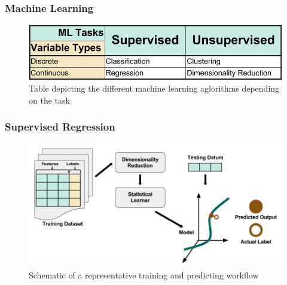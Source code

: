 \begin{frame}
  \frametitle{Machine Learning}
  \begin{figure}
    \centering
    \includegraphics[width=\textwidth]{./figures/ml-subjects.png}
    \caption{Table depicting the different machine learning aglorithms depending on the task}
  \end{figure}
\end{frame}

\begin{frame}
  \frametitle{Supervised Regression}
  \begin{figure}
    \centering
    \includegraphics[width=\textwidth]{./figures/SupervisedRegression.png}
    \caption{Schematic of a representative training and predicting workflow}
  \end{figure}
\end{frame}

